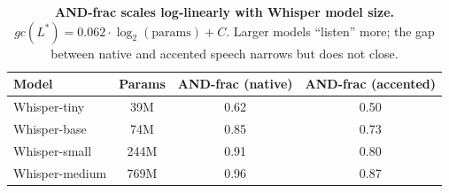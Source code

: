 \begin{table}[t]
\centering
\caption{%
  \textbf{AND-frac scales log-linearly with Whisper model size.}
  $gc(L^*) = 0.062 \cdot \log_2(\text{params}) + C$.
  Larger models ``listen'' more; the gap between native and accented speech
  narrows but does not close.
}
\label{tab:scaling}
\begin{tabular}{lccc}
\toprule
\textbf{Model} & \textbf{Params} & \textbf{AND-frac (native)} & \textbf{AND-frac (accented)} \\
\midrule
Whisper-tiny   &  39M & 0.62 & 0.50 \\
Whisper-base   &  74M & 0.85 & 0.73 \\
Whisper-small  & 244M & 0.91 & 0.80 \\
Whisper-medium & 769M & 0.96 & 0.87 \\
\bottomrule
\end{tabular}
\end{table}

